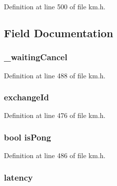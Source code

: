 Definition at line 500 of file km.\+h.



\subsection{Field Documentation}
\subsubsection[{\texorpdfstring{\+\_\+waiting\+Cancel}{_waitingCancel}}]{ \+\_\+waiting\+Cancel}\hypertarget{struct_k_1_1m_order_a078c85c357828219c070420c22e3215a}{}\label{struct_k_1_1m_order_a078c85c357828219c070420c22e3215a}


Definition at line 488 of file km.\+h.

\subsubsection[{\texorpdfstring{exchange\+Id}{exchangeId}}]{ exchange\+Id}\hypertarget{struct_k_1_1m_order_a74fdf2701cf5d1c94eb4cca99251668a}{}\label{struct_k_1_1m_order_a74fdf2701cf5d1c94eb4cca99251668a}


Definition at line 476 of file km.\+h.

\subsubsection[{\texorpdfstring{is\+Pong}{isPong}}]{\setlength{\rightskip}{0pt plus 5cm}bool is\+Pong}\hypertarget{struct_k_1_1m_order_ad675049a10e3a8e1c52973272bbea592}{}\label{struct_k_1_1m_order_ad675049a10e3a8e1c52973272bbea592}


Definition at line 486 of file km.\+h.

\subsubsection[{\texorpdfstring{latency}{latency}}]{ latency}\hypertarget{struct_k_1_1m_order_aa0b6b1a7135bcd07640a190bda611921}{}\label{struct_k_1_1m_order_aa0b6b1a7135bcd07640a190bda611921}


